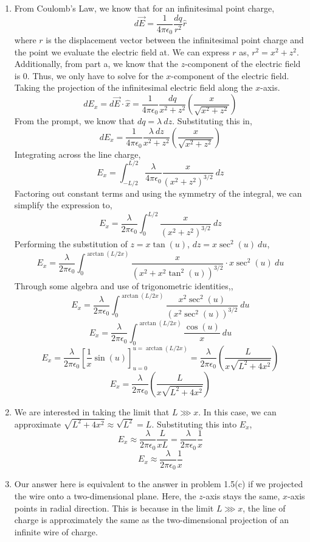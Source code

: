 \documentclass[12pt]{article}
\begin{document}
\begin{enumerate}
\begin{enumerate}
		\item [b.]
		From Coulomb's Law, we know that for an infinitesimal point charge,
		\[d\vec E = \frac{1}{4\pi\epsilon_0}\frac{dq}{r^2}\hat r\]
		where $r$ is the displacement vector between the infinitesimal point charge and the point we evaluate the electric field at.
		We can express $r$ as, $r^2=x^2+z^2$.
		Additionally, from part a, we know that the $z$-component of the electric field is 0.
		Thus, we only have to solve for the $x$-component of the electric field.
		Taking the projection of the infinitesimal electric field along the $x$-axis.
		\[dE_x = d\vec E \cdot \hat x = \frac{1}{4\pi\epsilon_0}\frac{dq}{x^2+z^2}\left(\frac {x}{\sqrt{x^2+z^2}}\right)\]
		From the prompt, we know that $dq = \lambda \: dz$.
		Substituting this in,
		\[dE_x=\frac{1}{4\pi\epsilon_0}\frac{\lambda \: dz}{x^2+z^2}\left(\frac{x}{\sqrt{x^2+z^2}}\right)\]
		Integrating across the line charge,
		\[E_x = \int_{-L/2}^{L/2}\frac{\lambda}{4\pi\epsilon_0}\frac{x}{(x^2+z^2)^{3/2}}\: dz\]
		Factoring out constant terms and using the symmetry of the integral, we can simplify the expression to,
		\[E_x = \frac{\lambda}{2\pi\epsilon_0}\int_0^{L/2}\frac{x}{(x^2+z^2)^{3/2}}\: dz\]
		Performing the substitution of $z=x\tan(u)$, $dz = x\sec^2(u)\: du$,
		\[E_x = \frac{\lambda}{2\pi\epsilon_0}\int_0^{\arctan(L/2x)}\frac{x}{(x^2+x^2\tan^2(u))^{3/2}}\cdot x\sec^2(u)\: du\]
		Through some algebra and use of trigonometric identities,,
		\[E_x = \frac{\lambda}{2\pi\epsilon_0}\int_0^{\arctan(L/2x)}\frac{ x^2\sec^2(u)}{(x^2\sec^2(u))^{3/2}}\: du\]
		\[E_x = \frac{\lambda}{2\pi\epsilon_0}\int_0^{\arctan(L/2x)}\frac{\cos(u)}{x}\: du\]
		\[E_x = \frac{\lambda}{2\pi\epsilon_0}\left[\frac{1}{x}\sin(u)\right]_{u=0}^{u=\arctan(L/2x)}=\frac{\lambda}{2\pi\epsilon_0}\left(\frac{L}{x\sqrt{L^2+4x^2}}\right)\]
		\[\boxed{E_x=\frac{\lambda}{2\pi\epsilon_0}\left(\frac{L}{x\sqrt{L^2+4x^2}}\right)}\]

		\item [c.]
		We are interested in taking the limit that $L\ggg x$.
		In this case, we can approximate $\sqrt{L^2+4x^2}\approx \sqrt{L^2} = L$.
		Substituting this into $E_x$,
		\[E_x\approx \frac{\lambda}{2\pi \epsilon_0}\frac{L}{xL}=\frac{\lambda}{2\pi\epsilon_0}\frac{1}{x}\]
		\[\boxed{E_x \approx \frac{\lambda}{2\pi\epsilon_0}\frac{1}{x}}\]

		\item [d.]
		Our answer here is equivalent to the answer in problem 1.5(c) if we projected the wire onto a two-dimensional plane.
		Here, the $z$-axis stays the same, $x$-axis points in radial direction.
		This is because in the limit $L\ggg x$, the line of charge is approximately the same as the two-dimensional projection of an infinite wire of charge.


\end{enumerate}
\end{enumerate}
\end{document}
